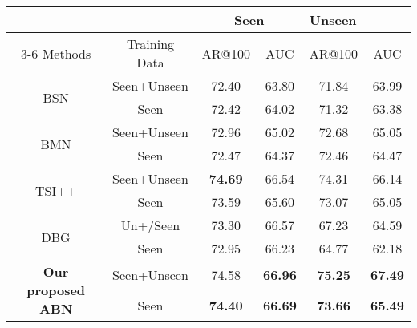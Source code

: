 \documentclass{ieeeaccess}
\begin{document}
\begin{table*}[t]
\centering
\caption{\textbf{Generalizability} evaluation on ActivityNet 1.3. The best performance is shown in \textbf{bold}.}
\begin{tabular}{c c c c c c}
&  & \multicolumn{2}{c}{Seen}   & \multicolumn{2}{l}{Unseen} \\ \cline{3-6}
Methods & Training Data & AR@100 & AUC   & AR@100  & AUC   \\ \hline
                         
\multirow{2}{*}{BSN \cite{lin2018bsn}}     & Seen+Unseen   & 72.40        & 63.80      & 71.84         & 63.99       \\ 
                         & Seen          & 72.42        & 64.02      & 71.32         & 63.38      \\ \hline
\multirow{2}{*}{BMN \cite{bmn}}     & Seen+Unseen   & 72.96        & 65.02      & 72.68         & 65.05       \\ 
                         & Seen          & 72.47        & 64.37      & 72.46         & 64.47       \\ \hline
\multirow{2}{*}{TSI++\cite{tsi_accv}}
& Seen+Unseen & \textbf{74.69} & 66.54 & 74.31 & 66.14 \\ 
& Seen        & 73.59 & 65.60 & 73.07 & 65.05 \\ \hline
\multirow{2}{*}{DBG\cite{dbg}}
& Un+/Seen & 73.30 &  66.57&  67.23 &  64.59\\ 
& Seen        & 72.95 &  66.23 &  64.77 &  62.18 \\ 
\hline

\multirow{2}{*}{\textbf{Our proposed ABN}} & Seen+Unseen   & 74.58       & \textbf{66.96 }     & \textbf{75.25 }        & \textbf{67.49}       \\ 
                         & Seen          & \textbf{74.40}        & \textbf{66.69  }    & \textbf{73.66}         & \textbf{65.49 }      \\ \hline
\end{tabular}
\label{tb:Generalizability}
\end{table*}
\end{document}
